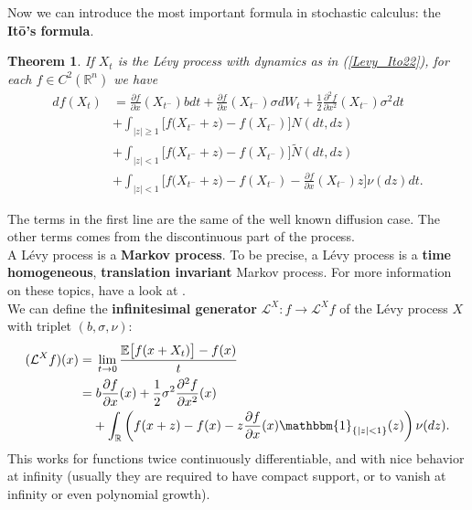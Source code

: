 \documentclass[a4paper,10pt]{article}
\newcommand{\numberset}{\mathbb}
\newcommand{\R}{\numberset{R}}
\newcommand{\E}{\numberset{E}}
\newcommand{\LL}{\mathcal{L}}
\newtheorem{Theorem}{Theorem}[section]
\begin{document}
Now we can introduce the most important formula in stochastic calculus: the \textbf{It\={o}'s formula}.
\begin{Theorem}
If $X_t$ is the Lévy process with dynamics as in (\ref{Levy_Ito22}), for each $f \in C^2(\R^n)$ we have  
\begin{align} \label{Ito_form}
 df(X_t) &=  \frac{\partial f}{\partial x}(X_{t^-}) b  dt  +  \frac{\partial f}{\partial x}(X_{t^-}) \sigma dW_t
          + \frac{1}{2} \frac{\partial^2 f}{\partial x^2}(X_{t^-}) \sigma^2 dt \\ \nonumber 
          &+ \int_{|z|\geq 1} \bigl[ f\bigl( X_{t^-} + z \bigr) - f( X_{t^-} ) \bigr] N(dt,dz) \\ \nonumber
          &+ \int_{|z|< 1} \bigl[ f\bigl( X_{t^-} + z \bigr) - f(X_{t^-}) \bigr] \tilde N(dt,dz) \\ \nonumber  
          &+ \int_{|z|< 1} \bigl[ f\bigl( X_{t^-} + z \bigr) - f(X_{t^-}) - \frac{\partial f}{\partial x}(X_{t^-}) z \bigr] \nu(dz)dt. \nonumber
\end{align}
\end{Theorem}
The terms in the first line are the same of the well known diffusion case. The other terms comes from the discontinuous part of the process.\\

\noindent
A Lévy process is a \textbf{Markov process}.
To be precise, a Lévy process is a \textbf{time homogeneous}, \textbf{translation invariant} Markov process. For more information on these topics, have a look at \cite{Applebaum}.\\

We can define the \textbf{infinitesimal generator} $\LL^X : f \to \LL^X f$ of the Lévy process $X$ with triplet $(b,\sigma,\nu)$:
 \begin{align}\label{genLevy}
  (\LL^X f)(x) =& \; \lim_{t\to0} \frac{\E \bigl[ f(x + X_t) \bigr] - f(x) }{t}  \\
             =& \;  b \frac{\partial f}{\partial x}(x) +
  \frac{1}{2} \sigma^2 \frac{\partial^2 f}{\partial x^2}(x)\\  
           & + \int_{\R} \left( f(x+z) - f(x) - z \frac{\partial f}{\partial x}(x) 
           \mathbbm{1}_{\{ |z|<1 \}}(z) \right) \nu(dz).   \nonumber
  \end{align}
This works for functions twice continuously differentiable, and with nice behavior at infinity (usually they are required to have compact support, or to vanish at infinity or even
polynomial growth).
\end{document}
